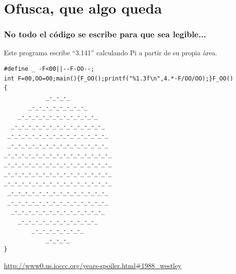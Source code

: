 %
%

\section{Ofusca, que algo queda}

\begin{frame}[fragile]
\frametitle{No todo el código se escribe para que sea legible...}

Este programa escribe ``3.141'' calculando Pi a partir de su propia área.

{\tiny
\begin{verbatim}
#define _ -F<00||--F-OO--;
int F=00,OO=00;main(){F_OO();printf("%1.3f\n",4.*-F/OO/OO);}F_OO()
{
            _-_-_-_
       _-_-_-_-_-_-_-_-_
    _-_-_-_-_-_-_-_-_-_-_-_
  _-_-_-_-_-_-_-_-_-_-_-_-_-_
 _-_-_-_-_-_-_-_-_-_-_-_-_-_-_
 _-_-_-_-_-_-_-_-_-_-_-_-_-_-_
_-_-_-_-_-_-_-_-_-_-_-_-_-_-_-_
_-_-_-_-_-_-_-_-_-_-_-_-_-_-_-_
_-_-_-_-_-_-_-_-_-_-_-_-_-_-_-_
_-_-_-_-_-_-_-_-_-_-_-_-_-_-_-_
 _-_-_-_-_-_-_-_-_-_-_-_-_-_-_
 _-_-_-_-_-_-_-_-_-_-_-_-_-_-_
  _-_-_-_-_-_-_-_-_-_-_-_-_-_
    _-_-_-_-_-_-_-_-_-_-_-_
        _-_-_-_-_-_-_-_
            _-_-_-_
}
\end{verbatim}
}

\begin{flushright}
{\small
\url{http://www0.us.ioccc.org/years-spoiler.html#1988_westley}
}
\end{flushright}

\end{frame}

